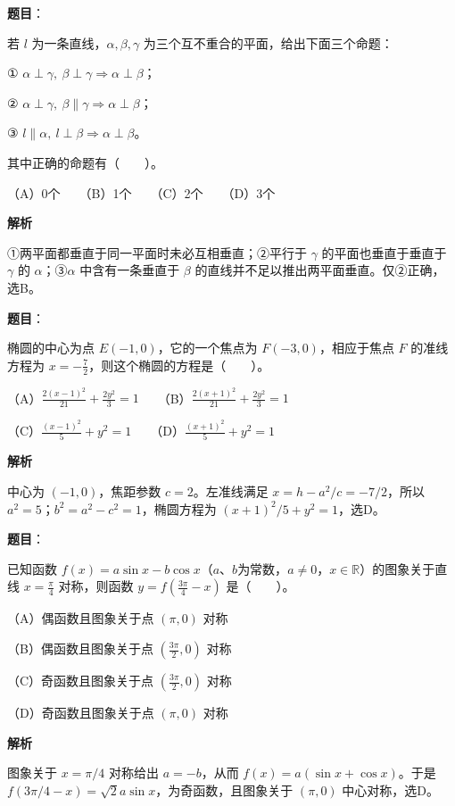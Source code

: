 \begin{answer}

\textbf{题目}：

若 $l$ 为一条直线，$\alpha,\beta,\gamma$ 为三个互不重合的平面，给出下面三个命题：

① $\alpha\perp\gamma,\ \beta\perp\gamma\Rightarrow\alpha\perp\beta$；

② $\alpha\perp\gamma,\ \beta\parallel\gamma\Rightarrow\alpha\perp\beta$；

③ $l\parallel\alpha,\ l\perp\beta\Rightarrow\alpha\perp\beta$。

其中正确的命题有\mbox{（　　）}。

（A）0个　　（B）1个　　（C）2个　　（D）3个

\textbf{解析}

①两平面都垂直于同一平面时未必互相垂直；②平行于 $\gamma$ 的平面也垂直于垂直于 $\gamma$ 的 $\alpha$；③$\alpha$ 中含有一条垂直于 $\beta$ 的直线并不足以推出两平面垂直。仅②正确，选B。


\end{answer}
\begin{answer}

\textbf{题目}：

椭圆的中心为点 $E(-1,0)$，它的一个焦点为 $F(-3,0)$，相应于焦点 $F$ 的准线方程为 $x=-\frac72$，则这个椭圆的方程是\mbox{（　　）}。

（A）$\frac{2(x-1)^2}{21}+\frac{2y^2}{3}=1$　　（B）$\frac{2(x+1)^2}{21}+\frac{2y^2}{3}=1$

（C）$\frac{(x-1)^2}{5}+y^2=1$　　（D）$\frac{(x+1)^2}{5}+y^2=1$

\textbf{解析}

中心为 $(-1,0)$，焦距参数 $c=2$。左准线满足 $x=h-a^2/c=-7/2$，所以 $a^2=5$；$b^2=a^2-c^2=1$，椭圆方程为 $(x+1)^2/5+y^2=1$，选D。


\end{answer}
\begin{answer}

\textbf{题目}：

已知函数 $f(x)=a\sin x-b\cos x$（$a\text{、}b$为常数，$a\ne0\text{，}x\in\mathbb R$）的图象关于直线 $x=\frac\pi4$ 对称，则函数 $y=f(\frac{3\pi}4-x)$ 是\mbox{（　　）}。

（A）偶函数且图象关于点 $(\pi,0)$ 对称

（B）偶函数且图象关于点 $(\frac{3\pi}2,0)$ 对称

（C）奇函数且图象关于点 $(\frac{3\pi}2,0)$ 对称

（D）奇函数且图象关于点 $(\pi,0)$ 对称

\textbf{解析}

图象关于 $x=\pi/4$ 对称给出 $a=-b$，从而 $f(x)=a(\sin x+\cos x)$。于是 $f(3\pi/4-x)=\sqrt2a\sin x$，为奇函数，且图象关于 $(\pi,0)$ 中心对称，选D。


\end{answer}
